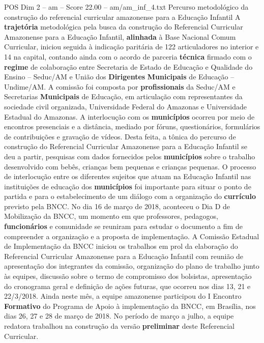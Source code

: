 \begin{textsample}{POS Dim 2 – am – Score 22.00 – am/am\_inf\_4.txt}  \label{ex:f2_pos_159}
Percurso metodológico da construção do referencial curricular amazonense para a Educação Infantil A \textbf{trajetória} metodológica pela busca da construção do Referencial Curricular Amazonense para a Educação Infantil, \textbf{alinhada} à Base Nacional Comum Curricular, iniciou seguida à indicação paritária de 122 articuladores no interior e 14 na capital, contando ainda com o acordo de parceria \textbf{técnica} firmado com o \textbf{regime} de colaboração entre Secretaria de Estado de Educação e Qualidade do Ensino – Seduc/AM e União dos \textbf{Dirigentes} \textbf{Municipais} de Educação – Undime/AM.
A comissão foi composta por \textbf{profissionais} da Seduc/AM e Secretarias \textbf{Municipais} de Educação, em articulação com representantes da sociedade civil organizada, Universidade Federal do Amazonas e Universidade Estadual do Amazonas.
A interlocução com os \textbf{municípios} ocorreu por meio de encontros presenciais e a distância, mediado por fóruns, questionários, formulários de contribuições e gravação de vídeos.
Desta feita, a tônica do percurso de construção do Referencial Curricular Amazonense para a Educação Infantil se deu a partir, pesquisas com dados fornecidos pelos \textbf{municípios} sobre o trabalho desenvolvido com bebês, crianças bem pequenas e crianças pequenas.
O processo de interlocução entre os diferentes sujeitos que atuam na Educação Infantil nas instituições de educação dos \textbf{municípios} foi importante para situar o ponto de partida e para o estabelecimento de um diálogo com a organização do \textbf{currículo} previsto pela BNCC.
No dia 16 de março de 2018, aconteceu o Dia D de Mobilização da BNCC, um momento em que professores, pedagogos, \textbf{funcionários} e comunidade se reuniram para estudar o documento a fim de compreender a organização e a proposta de implementação.
A Comissão Estadual de Implementação da BNCC iniciou os trabalhos em prol da elaboração do Referencial Curricular Amazonense para a Educação Infantil com reunião de apresentação dos integrantes da comissão, organização do plano de trabalho junto às equipes, discussão sobre o termo de compromisso dos bolsistas, apresentação do cronograma geral e definição de ações futuras, que ocorreu nos dias 13, 21 e 22/3/2018.
Ainda neste mês, a equipe amazonense participou do I Encontro \textbf{Formativo} do Programa de Apoio à implementação da BNCC, em Brasília, nos dias 26, 27 e 28 de março de 2018.
No período de março a julho, a equipe redatora trabalhou na construção da versão \textbf{preliminar} deste Referencial Curricular.

\end{textsample}
